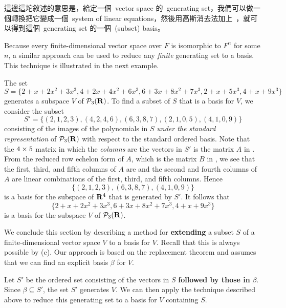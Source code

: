 \begin{note}
這邊這坨敘述的意思是，給定一個\ vector space 的\ generating set，我們可以做一個轉換把它變成一個\ system of linear equations，然後用高斯消去法加上\ ，就可以得到這個\ generating set 的一個\ (subset) basis。
\end{note}

Because every finite-dimensional vector space over \(F\) is isomorphic to \(F^n\) for some \(n\), a similar approach can be used to reduce any \emph{finite} generating set to a basis.
This technique is illustrated in the next example.

\begin{example} \label{example 3.4.3}
The set
\[
    S = \{
        2 + x + 2x^2 + 3x^3,
        4 + 2x + 4x^2 + 6x^3,
        6 + 3x + 8x^2 + 7x^3,
        2 + x + 5x^3,
        4 + x + 9x^3
    \}
\]
generates a subspace \(V\) of \(\mathcal{P}_{3}(\mathbf{R})\).
To find a subset of \(S\) that is a basis for \(V\), we consider the subset
\[
    S' = \{(2,1,2,3),(4,2,4,6),(6,3,8,7),(2,1,0,5),(4,1,0,9)\}
\]
consisting of the images of the polynomials in \(S\) \emph{under the standard representation} of \(\mathcal{P}_{3}(\mathbf{R})\) with respect to the standard ordered basis.
Note that the \(4 \times 5\) matrix in which the \emph{columns} are the vectors in \(S'\) is the matrix \(A\) in .
From the reduced row echelon form of \(A\), which is the matrix \(B\) in ,
we see that the first, third, and fifth columns of \(A\) are \LID{} and the second and fourth columns of  \(A\) are linear combinations of the first, third, and fifth columns.
Hence
\[
    \{(2,1,2,3),(6,3,8,7),(4,1,0,9)\}
\]
is a basis for the subspace of \(\mathbf{R}^4\) that is generated by \(S'\).
It follows that
\[
    \{
        2 + x + 2 x^2 + 3x^3,
        6 + 3x + 8x^2 + 7x^3,
        4 + x + 9x^3
    \}
\]
is a basis for the subspace \(V\) of \(\mathcal{P}_{3}(\mathbf{R})\).
\end{example}

We conclude this section by describing a method for \textbf{extending} a \LID{} subset \(S\) of a finite-dimensional vector space \(V\) to a basis for \(V\).
Recall that this is always possible by (c).
Our approach is based on the replacement theorem and assumes that we can find an explicit basis \(\beta\) for \(V\).

Let \(S'\) be the ordered set consisting of the vectors in \(S\) \textbf{followed by those in} \(\beta\).
Since \(\beta \subseteq S'\), the set \(S'\) generates \(V\).
We can then apply the technique described above to reduce
this generating set to a basis for \(V\) containing \(S\).

